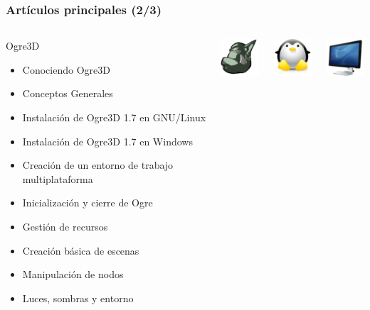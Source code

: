 \documentclass[green]{beamer}
\begin{document}
\begin{frame}
\transdissolve
    \frametitle{Artículos principales (2/3)}
        
    \begin{columns}[c]
    \column{230pt}
        
	\scriptsize{
	\begin{block}{Ogre3D}
            \begin{itemize}
                \item Conociendo Ogre3D
		\item Conceptos Generales
		\item Instalación de Ogre3D 1.7 en GNU/Linux
		\item Instalación de Ogre3D 1.7 en Windows
		\item Creación de un entorno de trabajo multiplataforma
		\item Inicialización y cierre de Ogre
		\item Gestión de recursos
		\item Creación básica de escenas
		\item Manipulación de nodos
		\item Luces, sombras y entorno
            \end{itemize}            
        \end{block}
	}

    \column{40pt}
        
	\begin{center}
	    \includegraphics[scale=0.3]{img/ogre.png}
	\end{center}
	
	\begin{center}
	    \includegraphics[scale=0.3]{img/tux.png}
	\end{center}
	
	\begin{center}
	    \includegraphics[scale=0.3]{img/trabajo.png}
	\end{center}
	

\end{columns}
\end{frame}
\end{document}
